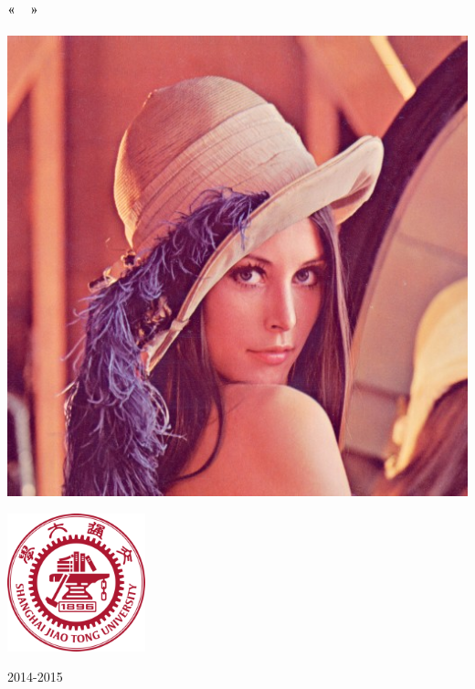 \begin{flushleft}
    \textbf \reportauthor
\end{flushleft}

\vspace{2.0cm}

\begin{center}
	\textsc{\Large \reportsubject}\\[0.3cm]
	\HRule \\[0.4cm]
	{\Huge \bfseries \reporttitle}\\[0.3cm]
	{\LARGE \bfseries «~\topic~»}\\[0.3cm]
	\HRule \\[1cm]

	\includegraphics [scale=0.6]{images/lenna.jpg} \\[0.7cm]

	\vfill

    \begin{flushright}
        \includegraphics[width=40mm]{images/SJTU_Logo.png}
    \end{flushright}

	\footnotesize{2014-2015}
\end{center}
